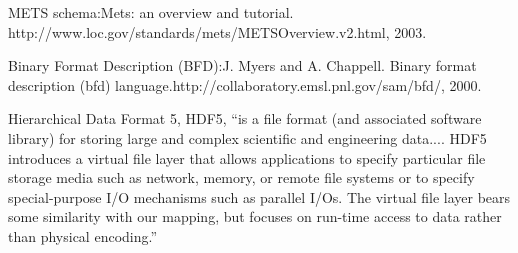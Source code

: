 \documentclass[11pt]{article}
\begin{document}
METS schema:Mets: an overview and
tutorial. http://www.loc.gov/standards/mets/METSOverview.v2.html, 2003.

Binary Format Description (BFD):J. Myers and A. Chappell. Binary
format description (bfd)
language.http://collaboratory.emsl.pnl.gov/sam/bfd/, 2000.

Hierarchical Data Format 5, HDF5, ``is a file format (and associated
software library) for storing large and complex scientific and
engineering data....
HDF5 introduces a virtual file layer that allows applications to
specify particular file storage media such as network, memory, or
remote file systems or to specify special-purpose I/O mechanisms such
as parallel I/Os. The virtual file layer bears some similarity with
our mapping, but focuses on run-time access to data rather than
physical encoding.''

{

}
\end{document}
